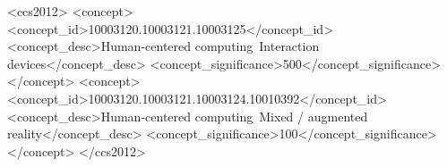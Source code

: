 \begin{CCSXML}
<ccs2012>
<concept>
<concept_id>10003120.10003121.10003125</concept_id>
<concept_desc>Human-centered computing~Interaction devices</concept_desc>
<concept_significance>500</concept_significance>
</concept>
<concept>
<concept_id>10003120.10003121.10003124.10010392</concept_id>
<concept_desc>Human-centered computing~Mixed / augmented reality</concept_desc>
<concept_significance>100</concept_significance>
</concept>
</ccs2012>
\end{CCSXML}


